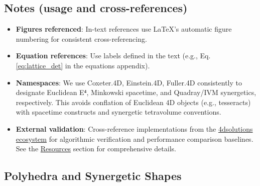 \documentclass[
  10pt,
]{article}
\providecommand{\tightlist}{%
  \setlength{\itemsep}{0pt}\setlength{\parskip}{0pt}}
\begin{document}
\hypertarget{notes-usage-and-cross-references}{%
\subsection{Notes (usage and
cross-references)}\label{notes-usage-and-cross-references}}

\begin{itemize}
\tightlist
\item
  \textbf{Figures referenced}: In-text references use LaTeX's automatic
  figure numbering for consistent cross-referencing.
\item
  \textbf{Equation references}: Use labels defined in the text (e.g.,
  Eq. \eqref{eq:lattice_det} in the equations appendix).
\item
  \textbf{Namespaces}: We use Coxeter.4D, Einstein.4D, Fuller.4D
  consistently to designate Euclidean E⁴, Minkowski spacetime, and
  Quadray/IVM synergetics, respectively. This avoids conflation of
  Euclidean 4D objects (e.g., tesseracts) with spacetime constructs and
  synergetic tetravolume conventions.
\item
  \textbf{External validation}: Cross-reference implementations from the
  \href{https://github.com/4dsolutions}{4dsolutions ecosystem} for
  algorithmic verification and performance comparison baselines. See the
  \href{07_resources.md}{Resources} section for comprehensive details.
\end{itemize}

\hypertarget{polyhedra-and-synergetic-shapes}{%
\subsection{Polyhedra and Synergetic
Shapes}\label{polyhedra-and-synergetic-shapes}}
\end{document}
